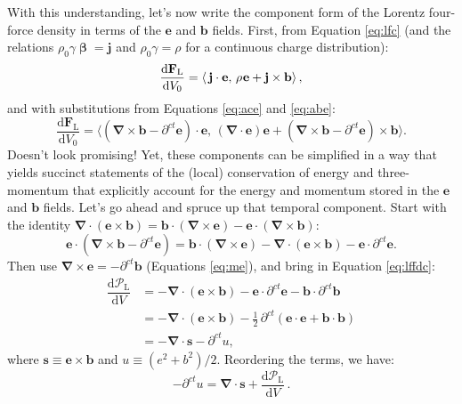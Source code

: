 \documentclass[12pt]{article}
\renewcommand{\vv}[1]{\mathbf{#1}}
\newcommand{\dd}[1]{\mathrm{d}#1}
\newcommand{\vvbeta}{\bm{\upbeta}}
\newcommand{\del}{\boldsymbol{\nabla}}
\begin{document}
With this understanding, let's now write the component form of the Lorentz four-force density in terms of the $\vv e$ and $\vv b$ fields. First, from Equation \ref{eq:lfc} (and the relations $\rho_0 \gamma \vvbeta = \vv j$ and $\rho_0 \gamma = \rho$ for a continuous charge distribution):
\begin{equation*}
\dfrac{\dd \vv F_{\mathrm{L}}}{\dd V_0} = \left \langle \, \vv j \cdot \vv e, \, \rho \mkern1mu \vv e + \vv j \times \vv b \right \rangle ,
\end{equation*}
and with substitutions from Equations \ref{eq:ace} and \ref{eq:abe}:
\begin{equation}\label{eq:lffdc2}
\dfrac{\dd \vv F_{\mathrm{L}}}{\dd V_0} = \Big \langle \left( \del \times \vv b - \partial^{ct} \vv e \right) \cdot \vv e , \, \left( \del \cdot \vv e \right) \vv e + \left( \del \times \vv b - \partial^{ct} \vv e \right) \times \vv b \Big \rangle .
\end{equation}
Doesn't look promising! Yet, these components can be simplified in a way that yields succinct statements of the (local) conservation of energy and three-momentum that explicitly account for the energy and momentum stored in the $\vv e$ and $\vv b$ fields. Let's go ahead and spruce up that temporal component. Start with the identity $\del \cdot (\vv e \times \vv b) = \vv b \cdot (\del \times \vv e) - \vv e \cdot (\del \times \vv b)$:
\begin{equation*}
\vv e \cdot \left( \del \times \vv b - \partial^{ct} \vv e \right) = \vv b \cdot \left( \del \times \vv e \right) - \del \cdot \left( \vv e \times \vv b \right) - \vv e \cdot \partial^{ct} \vv e .
\end{equation*}
Then use $\del \times \vv e = - \partial^{ct} \vv b$ (Equations \ref{eq:me}), and bring in Equation \ref{eq:lffdc}:
\begin{equation*}
\begin{split}
\dfrac{\dd \mathcal{P}_{\textrm{L}}}{\dd V} &= - \del \cdot \left( \vv e \times \vv b \right) - \vv e \cdot \partial^{ct} \vv e - \vv b \cdot \partial^{ct} \vv b  \\
&= - \del \cdot \left( \vv e \times \vv b \right) - \frac{1}{2} \, \partial^{ct} \left( \vv e \cdot \vv e + \vv b \cdot \vv b \right) \\[2pt]
&= - \del \cdot \vv s - \partial^{ct} u ,
\end{split}
\end{equation*}
where $\vv s \equiv \vv e \times \vv b$ and $u \equiv (e^2 + b^2)/2$. Reordering the terms, we have:
\begin{equation}\label{eq:py}
\boxed{ - \partial^{ct} u =  \del \cdot \vv s + \dfrac{\dd \mathcal{P}_{\textrm{L}}}{\dd V} } \, .
\end{equation}
\end{document}
